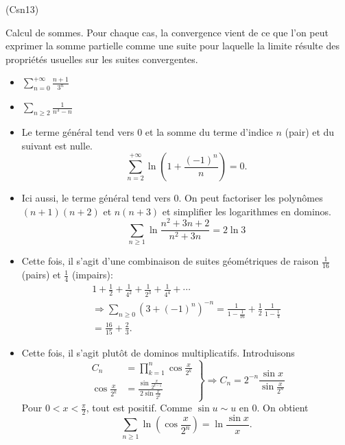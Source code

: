 \begin{tiny}(Csn13)\end{tiny} Calcul de sommes.\newline
Pour chaque cas, la convergence vient de ce que l'on peut exprimer la somme partielle comme une suite pour laquelle la limite résulte des propriétés usuelles sur les suites convergentes.

\begin{itemize}
  \item $\sum_{n=0}^{+\infty}\frac{n+1}{3^n}$
  \item $\sum_{n\geq 2} \frac{1}{n^3 - n}$
  \item Le terme général tend vers $0$ et la somme du terme d'indice $n$ (pair) et du suivant est nulle.
\[
 \sum_{n=2}^{+\infty}\ln\left( 1+\frac{(-1)^n}{n}\right) = 0.
\]

  \item Ici aussi, le terme général tend vers $0$. On peut factoriser les polynômes $(n+1)(n+2)$ et $n(n+3)$ et simplifier les logarithmes en dominos.
\[
\sum_{n\geq 1}\ln\frac{n^2+3n+2}{n^2+3n} = 2\ln 3 
\]

  \item Cette fois, il s'agit d'une combinaison de suites géométriques de raison $\frac{1}{16}$ (pairs) et $\frac{1}{4}$ (impairs):
\begin{multline*}
 1 + \frac{1}{2} + \frac{1}{4^2} + \frac{1}{2^3} + \frac{1}{4^4} + \cdots \\
 \Rightarrow 
\sum_{n\geq 0}\left( 3+(-1)^n\right)^{-n} = \frac{1}{1-\frac{1}{16}} + \frac{1}{2}\,\frac{1}{1-\frac{1}{4}}\\
= \frac{16}{15} + \frac{2}{3}.
\end{multline*}

  
  \item Cette fois, il s'agit plutôt de dominos multiplicatifs. Introduisons
\[
\left. 
\begin{aligned}
C_n &= \prod_{k=1}^{n}\cos \frac{x}{2^k} \\
\cos \frac{x}{2^k} & = \frac{\sin \frac{x}{2^{k-1}}}{2 \sin \frac{x}{2^{k}}}
\end{aligned}
\right\rbrace \Rightarrow
C_n = 2^{-n} \frac{\sin x}{\sin \frac{x}{2^{n}}}
\]
Pour $0< x < \frac{\pi}{2}$, tout est positif. Comme $\sin u \sim u$ en $0$. On obtient
\[
\sum_{n\geq 1}\ln(\cos\frac{x}{2^n}) = \ln \frac{\sin x}{x}. 
\]
 
\end{itemize}
